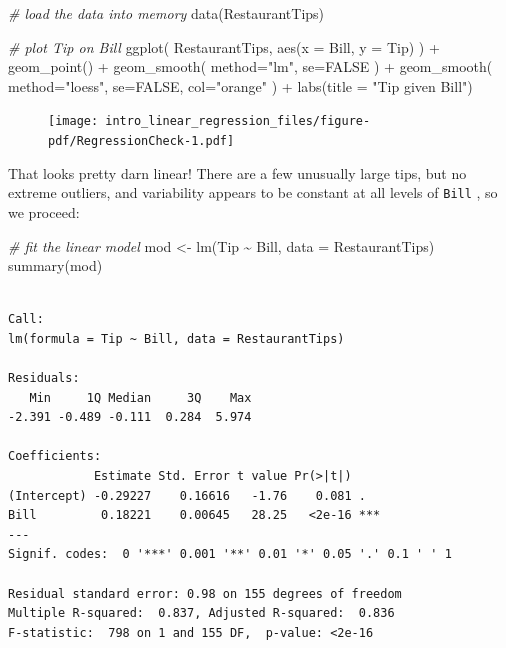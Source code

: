 \documentclass[
  letterpaper,
  DIV=11,
  numbers=noendperiod]{scrreprt}
\newenvironment{Shaded}{\begin{snugshade}}{\end{snugshade}}
\newcommand{\AttributeTok}[1]{\textcolor[rgb]{0.49,0.56,0.16}{#1}}
\newcommand{\CommentTok}[1]{\textcolor[rgb]{0.38,0.63,0.69}{\textit{#1}}}
\newcommand{\ConstantTok}[1]{\textcolor[rgb]{0.53,0.00,0.00}{#1}}
\newcommand{\FunctionTok}[1]{\textcolor[rgb]{0.02,0.16,0.49}{#1}}
\newcommand{\NormalTok}[1]{\textcolor[rgb]{0.00,0.44,0.13}{#1}}
\newcommand{\OtherTok}[1]{\textcolor[rgb]{0.00,0.44,0.13}{#1}}
\newcommand{\SpecialCharTok}[1]{\textcolor[rgb]{0.25,0.44,0.63}{#1}}
\newcommand{\StringTok}[1]{\textcolor[rgb]{0.25,0.44,0.63}{#1}}
\begin{document}
\begin{Shaded}
\begin{Highlighting}[]
\CommentTok{\# load the data into memory}
\FunctionTok{data}\NormalTok{(RestaurantTips)}

\CommentTok{\# plot Tip on Bill}
\FunctionTok{ggplot}\NormalTok{( RestaurantTips, }\FunctionTok{aes}\NormalTok{(}\AttributeTok{x =}\NormalTok{ Bill, }\AttributeTok{y =}\NormalTok{ Tip) ) }\SpecialCharTok{+}
    \FunctionTok{geom\_point}\NormalTok{() }\SpecialCharTok{+}
    \FunctionTok{geom\_smooth}\NormalTok{( }\AttributeTok{method=}\StringTok{"lm"}\NormalTok{, }\AttributeTok{se=}\ConstantTok{FALSE}\NormalTok{ ) }\SpecialCharTok{+}
    \FunctionTok{geom\_smooth}\NormalTok{( }\AttributeTok{method=}\StringTok{"loess"}\NormalTok{, }\AttributeTok{se=}\ConstantTok{FALSE}\NormalTok{, }\AttributeTok{col=}\StringTok{"orange"}\NormalTok{ ) }\SpecialCharTok{+}
    \FunctionTok{labs}\NormalTok{(}\AttributeTok{title =} \StringTok{"Tip given Bill"}\NormalTok{)}
\end{Highlighting}
\end{Shaded}

\begin{figure}[H]

{\centering \texttt{[image: intro\_linear\_regression\_files/figure-pdf/RegressionCheck-1.pdf]}

}

\end{figure}

That looks pretty darn linear! There are a few unusually large tips, but
no extreme outliers, and variability appears to be constant at all
levels of \texttt{Bill} , so we proceed:

\begin{Shaded}
\begin{Highlighting}[]
\CommentTok{\# fit the linear model}
\NormalTok{mod }\OtherTok{\textless{}{-}} \FunctionTok{lm}\NormalTok{(Tip }\SpecialCharTok{\textasciitilde{}}\NormalTok{ Bill, }\AttributeTok{data =}\NormalTok{ RestaurantTips)}
\FunctionTok{summary}\NormalTok{(mod)}
\end{Highlighting}
\end{Shaded}

\begin{verbatim}

Call:
lm(formula = Tip ~ Bill, data = RestaurantTips)

Residuals:
   Min     1Q Median     3Q    Max 
-2.391 -0.489 -0.111  0.284  5.974 

Coefficients:
            Estimate Std. Error t value Pr(>|t|)    
(Intercept) -0.29227    0.16616   -1.76    0.081 .  
Bill         0.18221    0.00645   28.25   <2e-16 ***
---
Signif. codes:  0 '***' 0.001 '**' 0.01 '*' 0.05 '.' 0.1 ' ' 1

Residual standard error: 0.98 on 155 degrees of freedom
Multiple R-squared:  0.837, Adjusted R-squared:  0.836 
F-statistic:  798 on 1 and 155 DF,  p-value: <2e-16
\end{verbatim}
\end{document}
